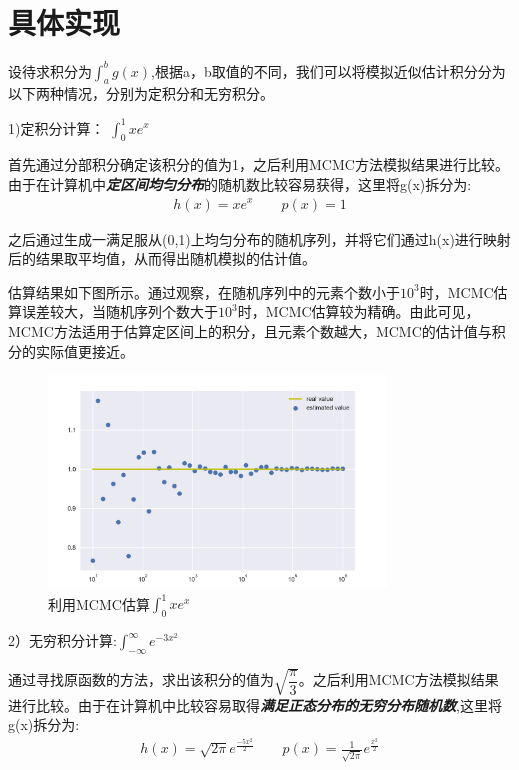 \documentclass[paper=a4, fontsize=11pt]{scrartcl} %
\numberwithin{equation}{section} %
\numberwithin{figure}{section} %
\numberwithin{table}{section} %
\begin{document}
\vspace{1cm}

\section{具体实现}
设待求积分为$\int_a^b{g(x)}$,根据a，b取值的不同，我们可以将模拟近似估计积分分为以下两种情况，分别为定积分和无穷积分。

1)定积分计算：   $\int_0^1{x e^{x}}$

首先通过分部积分确定该积分的值为1，之后利用MCMC方法模拟结果进行比较。由于在计算机中\emph{\textbf{定区间均匀分布}}的随机数比较容易获得，这里将g(x)拆分为:
\begin{gather*}
h(x) = x e^{x}  \qquad p(x) = 1
\end{gather*}

之后通过生成一满足服从(0,1)上均匀分布的随机序列，并将它们通过h(x)进行映射后的结果取平均值，从而得出随机模拟的估计值。

估算结果如下图所示。通过观察，在随机序列中的元素个数小于$10^{3}$时，MCMC估算误差较大，当随机序列个数大于$10^{3}$时，MCMC估算较为精确。由此可见，MCMC方法适用于估算定区间上的积分，且元素个数越大，MCMC的估计值与积分的实际值更接近。


\begin{figure}[H]
	\centering
	\includegraphics[width=0.8\textwidth]{1}
	\caption{利用MCMC估算$\int_0^1{x e^{x}}$}
\end{figure}

\vspace{1cm}
2）无穷积分计算:\quad $\int_{-\infty}^{\infty}e^{-3x^2}$

通过寻找原函数的方法，求出该积分的值为$\sqrt{\dfrac{\pi}{3}}$。之后利用MCMC方法模拟结果进行比较。由于在计算机中比较容易取得\emph{\textbf{满足正态分布的无穷分布随机数}},这里将g(x)拆分为:
\begin{gather*}
h(x) = \sqrt{2\pi}e^{\frac{-5x^{2}}{2}} \qquad p(x) = \frac{1}{\sqrt{2\pi}} e^{\frac{x^{2}}{2}}
\end{gather*}
\end{document}
